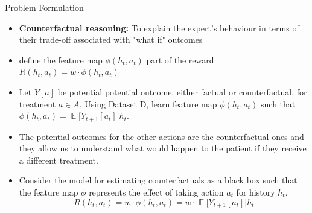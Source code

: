 \documentclass{beamer}
\DeclareMathOperator{\EX}{\mathbb{E}}%
\begin{document}
\begin{frame}{Problem Formulation}
    \begin{itemize}

        \item \textbf{Counterfactual reasoning:} To explain the expert’s behaviour in terms of their trade-off associated with "what if" outcomes

        \item define the feature map $\phi(h_t, a_t)$ part of the reward $R(h_t, a_t) = w \cdot \phi(h_t, a_t)$

        \item Let $Y[a]$ be potential potential outcome, either factual or counterfactual, for treatment $ a \in A$. Using Dataset D, learn feature map $\phi(h_t, a_t)$ such that $\phi(h_t, a_t) = \EX[Y_{t+1}[a_t] | h_t$.
        \item The potential outcomes for the other actions are the counterfactual ones and they allow us to understand what would happen to the patient if they receive a different treatment.
        \item Consider the model for estimating counterfactuals as a black box such that the feature map $\phi$ represents the effect of taking action $a_t$ for history $h_t$.
        \vspace{-0.5cm}
        \begin{equation*}
            R(h_t, a_t) = w \cdot \phi(h_t, a_t) = w \cdot \EX[Y_{t+1}[a_t] | h_t
        \end{equation*}
    \end{itemize}
\end{frame}
\end{document}
